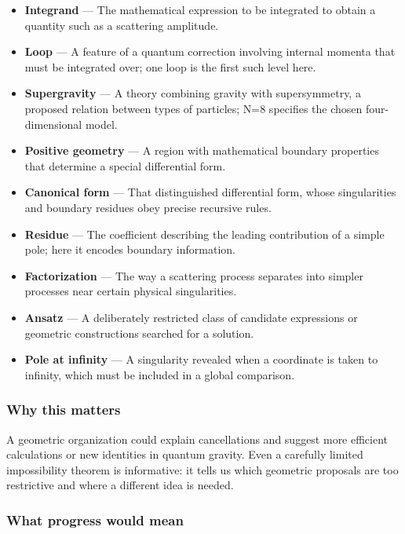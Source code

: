 \documentclass[
  11pt,
]{article}
\begin{document}
\begin{itemize}
\item
  \textbf{Integrand} --- The mathematical expression to be integrated to
  obtain a quantity such as a scattering amplitude.
\item
  \textbf{Loop} --- A feature of a quantum correction involving internal
  momenta that must be integrated over; one loop is the first such level
  here.
\item
  \textbf{Supergravity} --- A theory combining gravity with
  supersymmetry, a proposed relation between types of particles; N=8
  specifies the chosen four-dimensional model.
\item
  \textbf{Positive geometry} --- A region with mathematical boundary
  properties that determine a special differential form.
\item
  \textbf{Canonical form} --- That distinguished differential form,
  whose singularities and boundary residues obey precise recursive
  rules.
\item
  \textbf{Residue} --- The coefficient describing the leading
  contribution of a simple pole; here it encodes boundary information.
\item
  \textbf{Factorization} --- The way a scattering process separates into
  simpler processes near certain physical singularities.
\item
  \textbf{Ansatz} --- A deliberately restricted class of candidate
  expressions or geometric constructions searched for a solution.
\item
  \textbf{Pole at infinity} --- A singularity revealed when a coordinate
  is taken to infinity, which must be included in a global comparison.
\end{itemize}

\subsubsection{Why this matters}

A geometric organization could explain cancellations and suggest more
efficient calculations or new identities in quantum gravity. Even a
carefully limited impossibility theorem is informative: it tells us
which geometric proposals are too restrictive and where a different idea
is needed.

\subsubsection{What progress would mean}
\end{document}
